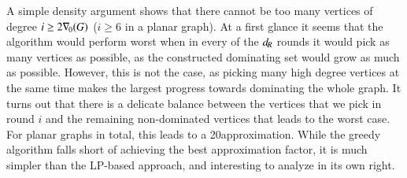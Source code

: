 A simple density argument shows
that there cannot be too many vertices of degree $i\geq 2\nabla_{\hspace{-1pt}0}(G)$ ($i\geq 6$ in a planar graph). At a first glance it seems that the algorithm would perform worst
when in every of the $d_{\hspace{-1pt}R}$ rounds it would pick as many vertices as possible,
as the constructed dominating set would grow as much as possible. However,
this is not the case, as picking many high degree vertices at the same time makes
the largest progress towards dominating the whole graph. It turns
out that there is a delicate balance between the vertices that we pick
in round $i$ and the remaining non-dominated vertices that leads
to the worst case.
For planar graphs in total, this
leads to a 20\hspace{1pt}\raisebox{0.3pt}{-}\hspace{0.9pt}approximation.
While the greedy algorithm falls short of achieving the best approximation
factor, it is much simpler than the LP-based approach, and interesting to
analyze in its own right.

%

